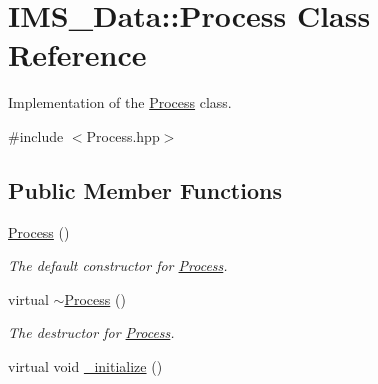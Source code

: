 \hypertarget{classIMS__Data_1_1Process}{
\section{IMS\_\-Data::Process Class Reference}
\label{classIMS__Data_1_1Process}
}


Implementation of the \hyperlink{classIMS__Data_1_1Process}{Process} class.  




{\ttfamily \#include $<$Process.hpp$>$}

\subsection*{Public Member Functions}
\begin{DoxyCompactItemize}
\item 
\hypertarget{classIMS__Data_1_1Process_abf6b3897ba8d634c5fe77ff5825108a6}{
\hyperlink{classIMS__Data_1_1Process_abf6b3897ba8d634c5fe77ff5825108a6}{Process} ()}
\label{classIMS__Data_1_1Process_abf6b3897ba8d634c5fe77ff5825108a6}

\begin{DoxyCompactList}\small\item\em The default constructor for \hyperlink{classIMS__Data_1_1Process}{Process}. \item\end{DoxyCompactList}\item 
\hypertarget{classIMS__Data_1_1Process_af284d2df12f3824d495f769ce4c06bcd}{
virtual \hyperlink{classIMS__Data_1_1Process_af284d2df12f3824d495f769ce4c06bcd}{$\sim$Process} ()}
\label{classIMS__Data_1_1Process_af284d2df12f3824d495f769ce4c06bcd}

\begin{DoxyCompactList}\small\item\em The destructor for \hyperlink{classIMS__Data_1_1Process}{Process}. \item\end{DoxyCompactList}\item 
\hypertarget{classIMS__Data_1_1Process_a8c0a314af56cfb908008bdd53851bd9a}{
virtual void \hyperlink{classIMS__Data_1_1Process_a8c0a314af56cfb908008bdd53851bd9a}{\_\-initialize} ()}
\label{classIMS__Data_1_1Process_a8c0a314af56cfb908008bdd53851bd9a}


\end{DoxyCompactItemize}
